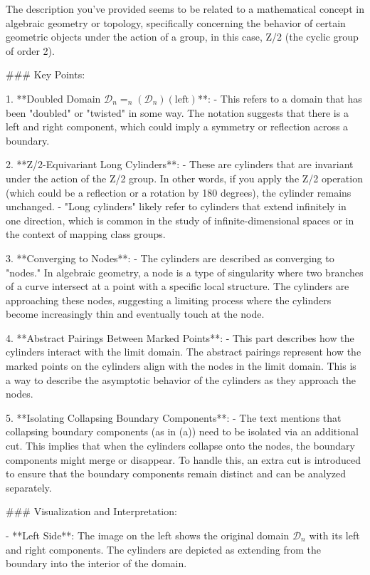 The description you've provided seems to be related to a mathematical concept in algebraic geometry or topology, specifically concerning the behavior of certain geometric objects under the action of a group, in this case, Z/2 (the cyclic group of order 2).

### Key Points:

1. **Doubled Domain \( \mathcal{D}_n = _n(\mathcal{D}_n)(\text{left}) \)**:
   - This refers to a domain that has been "doubled" or "twisted" in some way. The notation suggests that there is a left and right component, which could imply a symmetry or reflection across a boundary.

2. **Z/2-Equivariant Long Cylinders**:
   - These are cylinders that are invariant under the action of the Z/2 group. In other words, if you apply the Z/2 operation (which could be a reflection or a rotation by 180 degrees), the cylinder remains unchanged.
   - "Long cylinders" likely refer to cylinders that extend infinitely in one direction, which is common in the study of infinite-dimensional spaces or in the context of mapping class groups.

3. **Converging to Nodes**:
   - The cylinders are described as converging to "nodes." In algebraic geometry, a node is a type of singularity where two branches of a curve intersect at a point with a specific local structure. The cylinders are approaching these nodes, suggesting a limiting process where the cylinders become increasingly thin and eventually touch at the node.

4. **Abstract Pairings Between Marked Points**:
   - This part describes how the cylinders interact with the limit domain. The abstract pairings represent how the marked points on the cylinders align with the nodes in the limit domain. This is a way to describe the asymptotic behavior of the cylinders as they approach the nodes.

5. **Isolating Collapsing Boundary Components**:
   - The text mentions that collapsing boundary components (as in (a)) need to be isolated via an additional cut. This implies that when the cylinders collapse onto the nodes, the boundary components might merge or disappear. To handle this, an extra cut is introduced to ensure that the boundary components remain distinct and can be analyzed separately.

### Visualization and Interpretation:

- **Left Side**: The image on the left shows the original domain \( \mathcal{D}_n \) with its left and right components. The cylinders are depicted as extending from the boundary into the interior of the domain.
  
